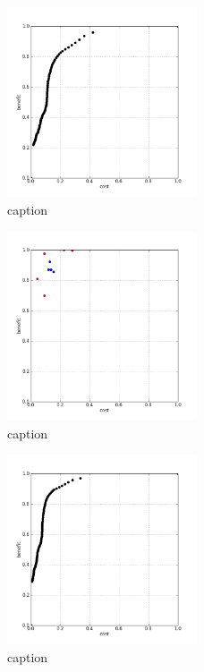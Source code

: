 %
\begin{figure}[!ht]
	\centering
	\includegraphics[width=0.5\textwidth]{img/p1figs/computeFrameStateAnders_sectionCompareBetter_smooth0_tol24_AUC.png}
	\caption{caption}
\end{figure}
%
\begin{figure}[!ht]
	\centering
	\includegraphics[width=0.5\textwidth]{img/p1figs/computeFrameStateAnders_sectionCompareBetter_smooth0_tol48.png}
	\caption{caption}
\end{figure}
%
\begin{figure}[!ht]
	\centering
	\includegraphics[width=0.5\textwidth]{img/p1figs/computeFrameStateAnders_sectionCompareBetter_smooth0_tol48_AUC.png}
	\caption{caption}
\end{figure}
